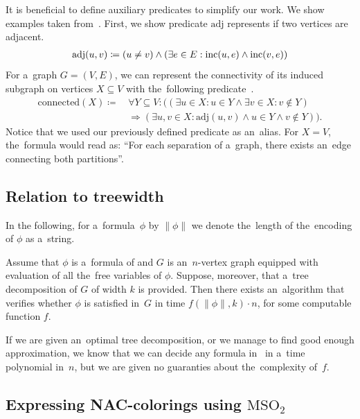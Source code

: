 It is beneficial to define auxiliary predicates to simplify our work.
We show examples taken from~\cite{book_parametrized_algorithms}.
First, we show predicate \( \text{adj} \) represents if two vertices are adjacent.
%
\begin{align*}
	\text{adj}(u, v) \coloneqq (u \ne v) \land (\exists e \in E : \text{inc} (u, e) \land \text{inc} (v, e))
\end{align*}
%
For a~graph \( G = (V, E) \), we can represent the connectivity of its induced subgraph
on vertices \( X \subseteq V \) with the~following predicate~\cite{book_parametrized_algorithms}.
%
\begin{align*}
	\text{connected}(X) \coloneqq \, &
	\forall Y \subseteq V : \Big(
	(
	\exists u \in X : u \in Y \land
	\exists v \in X : v \not\in Y
	)
	\\ &
	\Rightarrow
	(
	\exists u, v \in X : \text{adj}(u, v) \land u \in Y \land v \not\in Y
	)\Big).
\end{align*}
%
Notice that we used our previously defined predicate as an~alias.
For \( X = V \), the~formula would read as:
``For each separation of a~graph, there exists an~edge connecting both partitions''.

\subsection{Relation to treewidth}

In the following, for a~formula~\( \phi \) by \( \|\phi\| \)
we denote the~length of the~encoding of \( \phi \) as a~string.
%
\begin{theorem}%
	\label{theorem:courcelles_theorem}%
	Assume that \( \phi \) is a~formula of \MSO{} and
	\( G \) is an~\( n \)-vertex graph equipped
	with evaluation of all the~free variables of \( \phi \).
	Suppose, moreover, that a~tree decomposition of \( G \) of width \( k \) is provided.
	Then there exists an~algorithm that verifies whether \( \phi \)
	is satisfied in~\( G \) in time \( f (\|\phi\|, k) \cdot n \),
	for some computable function \( f \).
\end{theorem}
%
If we are given an~optimal tree decomposition, or we manage to find good enough
approximation, we know that we can decide any formula in~\MSO{} in a~time
polynomial in~\( n \), but we are given no guaranties about the~complexity of~\( f \).

\subsection{Expressing NAC-colorings using \( \text{MSO}_2 \)}

